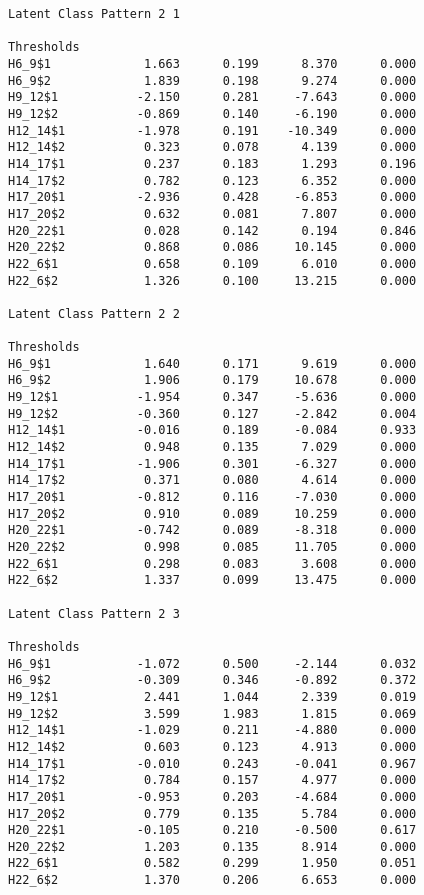\begin{verbatim}
Latent Class Pattern 2 1

Thresholds
H6_9$1             1.663      0.199      8.370      0.000
H6_9$2             1.839      0.198      9.274      0.000
H9_12$1           -2.150      0.281     -7.643      0.000
H9_12$2           -0.869      0.140     -6.190      0.000
H12_14$1          -1.978      0.191    -10.349      0.000
H12_14$2           0.323      0.078      4.139      0.000
H14_17$1           0.237      0.183      1.293      0.196
H14_17$2           0.782      0.123      6.352      0.000
H17_20$1          -2.936      0.428     -6.853      0.000
H17_20$2           0.632      0.081      7.807      0.000
H20_22$1           0.028      0.142      0.194      0.846
H20_22$2           0.868      0.086     10.145      0.000
H22_6$1            0.658      0.109      6.010      0.000
H22_6$2            1.326      0.100     13.215      0.000

Latent Class Pattern 2 2

Thresholds
H6_9$1             1.640      0.171      9.619      0.000
H6_9$2             1.906      0.179     10.678      0.000
H9_12$1           -1.954      0.347     -5.636      0.000
H9_12$2           -0.360      0.127     -2.842      0.004
H12_14$1          -0.016      0.189     -0.084      0.933
H12_14$2           0.948      0.135      7.029      0.000
H14_17$1          -1.906      0.301     -6.327      0.000
H14_17$2           0.371      0.080      4.614      0.000
H17_20$1          -0.812      0.116     -7.030      0.000
H17_20$2           0.910      0.089     10.259      0.000
H20_22$1          -0.742      0.089     -8.318      0.000
H20_22$2           0.998      0.085     11.705      0.000
H22_6$1            0.298      0.083      3.608      0.000
H22_6$2            1.337      0.099     13.475      0.000

Latent Class Pattern 2 3

Thresholds
H6_9$1            -1.072      0.500     -2.144      0.032
H6_9$2            -0.309      0.346     -0.892      0.372
H9_12$1            2.441      1.044      2.339      0.019
H9_12$2            3.599      1.983      1.815      0.069
H12_14$1          -1.029      0.211     -4.880      0.000
H12_14$2           0.603      0.123      4.913      0.000
H14_17$1          -0.010      0.243     -0.041      0.967
H14_17$2           0.784      0.157      4.977      0.000
H17_20$1          -0.953      0.203     -4.684      0.000
H17_20$2           0.779      0.135      5.784      0.000
H20_22$1          -0.105      0.210     -0.500      0.617
H20_22$2           1.203      0.135      8.914      0.000
H22_6$1            0.582      0.299      1.950      0.051
H22_6$2            1.370      0.206      6.653      0.000


\end{verbatim}
